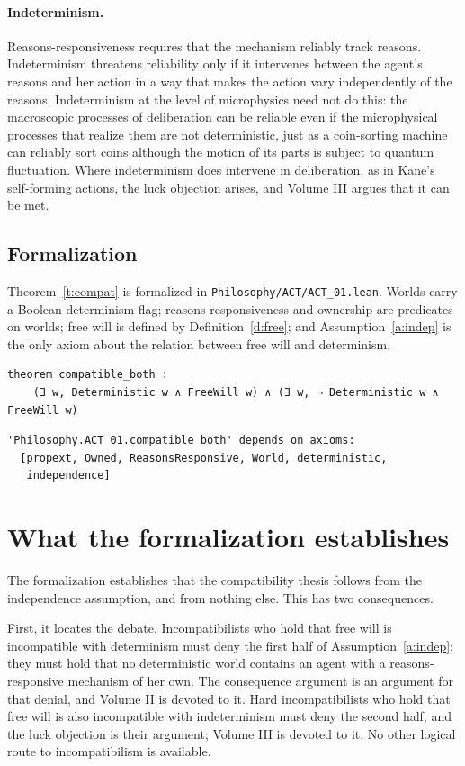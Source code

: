 \documentclass{situationist-preprint}
\begin{document}
\paragraph{Indeterminism.} Reasons-responsiveness requires that the mechanism reliably track reasons. Indeterminism threatens reliability only if it intervenes between the agent's reasons and her action in a way that makes the action vary independently of the reasons. Indeterminism at the level of microphysics need not do this: the macroscopic processes of deliberation can be reliable even if the microphysical processes that realize them are not deterministic, just as a coin-sorting machine can reliably sort coins although the motion of its parts is subject to quantum fluctuation. Where indeterminism does intervene in deliberation, as in Kane's self-forming actions, the luck objection arises, and Volume III argues that it can be met.

\subsection{Formalization}

Theorem~\ref{t:compat} is formalized in \nolinkurl{Philosophy/ACT/ACT_01.lean}. Worlds carry a Boolean determinism flag; reasons-responsiveness and ownership are predicates on worlds; free will is defined by Definition~\ref{d:free}; and Assumption~\ref{a:indep} is the only axiom about the relation between free will and determinism.

\begin{lstlisting}
theorem compatible_both :
    (∃ w, Deterministic w ∧ FreeWill w) ∧ (∃ w, ¬ Deterministic w ∧ FreeWill w)
\end{lstlisting}

\begin{lstlisting}
'Philosophy.ACT_01.compatible_both' depends on axioms:
  [propext, Owned, ReasonsResponsive, World, deterministic,
   independence]
\end{lstlisting}

\section{What the formalization establishes}

The formalization establishes that the compatibility thesis follows from the independence assumption, and from nothing else. This has two consequences.

First, it locates the debate. Incompatibilists who hold that free will is incompatible with determinism must deny the first half of Assumption~\ref{a:indep}: they must hold that no deterministic world contains an agent with a reasons-responsive mechanism of her own. The consequence argument is an argument for that denial, and Volume II is devoted to it. Hard incompatibilists who hold that free will is also incompatible with indeterminism must deny the second half, and the luck objection is their argument; Volume III is devoted to it. No other logical route to incompatibilism is available.
\end{document}
